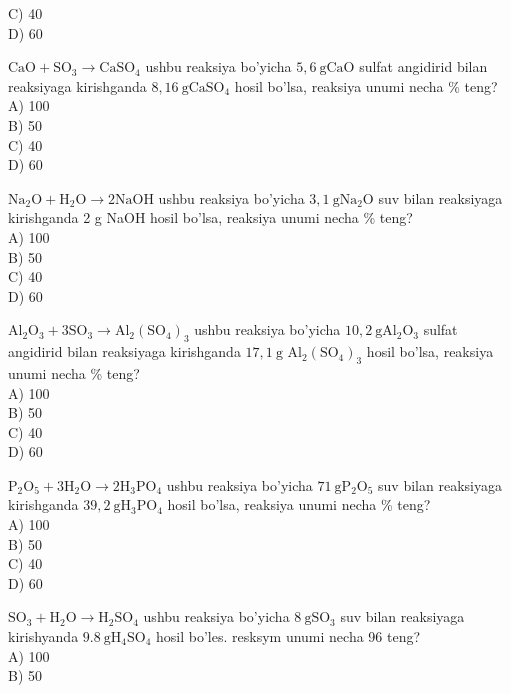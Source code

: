 C) 40\\
D) 60
  \item $\mathrm{CaO}+\mathrm{SO}_{3} \rightarrow \mathrm{CaSO}_{4}$ ushbu reaksiya bo'yicha $5,6 \mathrm{~g} \mathrm{CaO}$ sulfat angidirid bilan reaksiyaga kirishganda $8,16 \mathrm{~g} \mathrm{CaSO}_{4}$ hosil bo'lsa, reaksiya unumi necha \% teng?\\
A) 100\\
B) 50\\
C) 40\\
D) 60
  \item $\mathrm{Na}_{2} \mathrm{O}+\mathrm{H}_{2} \mathrm{O} \rightarrow 2 \mathrm{NaOH}$ ushbu reaksiya bo'yicha $3,1 \mathrm{~g} \mathrm{Na}_{2} \mathrm{O}$ suv bilan reaksiyaga kirishganda 2 g NaOH hosil bo'lsa, reaksiya unumi necha \% teng?\\
A) 100\\
B) 50\\
C) 40\\
D) 60
  \item $\mathrm{Al}_{2} \mathrm{O}_{3}+3 \mathrm{SO}_{3} \rightarrow \mathrm{Al}_{2}\left(\mathrm{SO}_{4}\right)_{3}$ ushbu reaksiya bo'yicha $10,2 \mathrm{~g} \mathrm{Al}_{2} \mathrm{O}_{3}$ sulfat angidirid bilan reaksiyaga kirishganda $17,1 \mathrm{~g}$ $\mathrm{Al}_{2}\left(\mathrm{SO}_{4}\right)_{3}$ hosil bo'lsa, reaksiya unumi necha \% teng?\\
A) 100\\
B) 50\\
C) 40\\
D) 60
  \item $\mathrm{P}_{2} \mathrm{O}_{5}+3 \mathrm{H}_{2} \mathrm{O} \rightarrow 2 \mathrm{H}_{3} \mathrm{PO}_{4}$ ushbu reaksiya bo'yicha $71 \mathrm{~g} \mathrm{P}_{2} \mathrm{O}_{5}$ suv bilan reaksiyaga kirishganda $39,2 \mathrm{~g} \mathrm{H}_{3} \mathrm{PO}_{4}$ hosil bo'lsa, reaksiya unumi necha \% teng?\\
A) 100\\
B) 50\\
C) 40\\
D) 60
  \item $\mathrm{SO}_{3}+\mathrm{H}_{2} \mathrm{O} \rightarrow \mathrm{H}_{2} \mathrm{SO}_{4}$ ushbu reaksiya bo'yicha $8 \mathrm{~g} \mathrm{SO}_{3}$ suv bilan reaksiyaga\\
kirishyanda $9.8 \mathrm{~g} \mathrm{H}_{4} \mathrm{SO}_{4}$ hosil bo'les. resksym unumi necha 96 teng?\\
A) 100\\
B) 50\\
